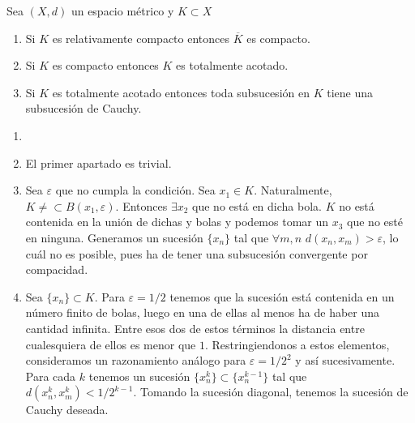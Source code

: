 \documentclass[FyPI.tex]{subfiles}
\begin{document}
\begin{lema}
Sea $(X,d)$ un espacio métrico y $K\subset X$
\begin{enumerate}
\item Si $K$ es relativamente compacto entonces $\overline{K}$ es compacto.
\item Si $K$ es compacto entonces $K$ es totalmente acotado.
\item Si $K$ es totalmente acotado entonces toda subsucesión en $K$ tiene una subsucesión de Cauchy.
\end{enumerate}
\end{lema}
\begin{dem}
\begin{enumerate}
\item[]	
\item El primer apartado es trivial.
\item Sea $\varepsilon$ que no cumpla la condición. Sea $x_1 \in K$. Naturalmente, $K\neq\subset B(x_1,\varepsilon)$. Entonces $\exists x_2$ que no está en dicha bola. $K$ no está contenida en la unión de dichas y bolas y podemos tomar un $x_3$ que no esté en ninguna. Generamos un sucesión $\{x_n\}$ tal que $\forall m,n$ $d(x_n,x_m)>\varepsilon$, lo cuál no es posible, pues ha de tener una subsucesión convergente por compacidad.
\item Sea $\{x_n\}\subset K$. Para $\varepsilon=1/2$ tenemos que la sucesión está contenida en un número finito de bolas, luego en una de ellas al menos ha de haber una cantidad infinita. Entre esos dos de estos términos la distancia entre cualesquiera de ellos es menor que $1$. Restringiendonos a estos elementos, consideramos un razonamiento análogo para $\varepsilon=1/2^2$ y así sucesivamente. Para cada $k$ tenemos un sucesión $\{x^k_n\} \subset \{x_n^{k-1}\}$ tal que $d(x_n^k,x_m^k) < 1/2^{k-1}$. Tomando la sucesión diagonal, tenemos la sucesión de Cauchy deseada.
\end{enumerate}
\end{dem}
\end{document}
